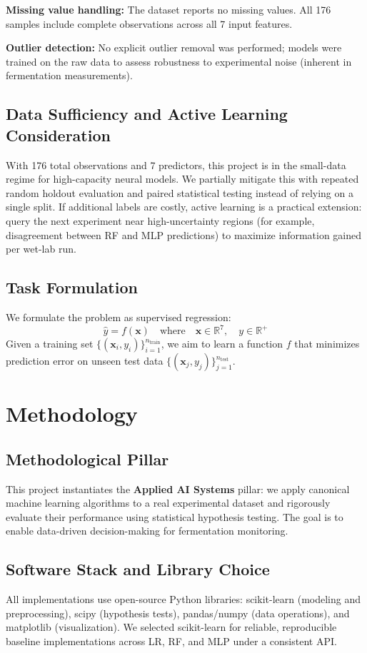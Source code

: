 \documentclass[conference]{IEEEtran}
\begin{document}
\textbf{Missing value handling:} The dataset reports no missing values. All 176 samples include complete observations across all 7 input features.

\textbf{Outlier detection:} No explicit outlier removal was performed; models were trained on the raw data to assess robustness to experimental noise (inherent in fermentation measurements).

\subsection{Data Sufficiency and Active Learning Consideration}
With 176 total observations and 7 predictors, this project is in the small-data regime for high-capacity neural models. We partially mitigate this with repeated random holdout evaluation and paired statistical testing instead of relying on a single split. If additional labels are costly, active learning is a practical extension: query the next experiment near high-uncertainty regions (for example, disagreement between RF and MLP predictions) to maximize information gained per wet-lab run.

\subsection{Task Formulation}
We formulate the problem as supervised regression:
\[
\hat{y} = f(\mathbf{x}) \quad \text{where} \quad \mathbf{x} \in \mathbb{R}^7, \quad y \in \mathbb{R}^+
\]
Given a training set $\{(\mathbf{x}_i, y_i)\}_{i=1}^{n_{\text{train}}}$, we aim to learn a function $f$ that minimizes prediction error on unseen test data $\{(\mathbf{x}_j, y_j)\}_{j=1}^{n_{\text{test}}}$.

\section{Methodology}

\subsection{Methodological Pillar}
This project instantiates the \textbf{Applied AI Systems} pillar: we apply canonical machine learning algorithms to a real experimental dataset and rigorously evaluate their performance using statistical hypothesis testing. The goal is to enable data-driven decision-making for fermentation monitoring.

\subsection{Software Stack and Library Choice}
All implementations use open-source Python libraries: scikit-learn (modeling and preprocessing), scipy (hypothesis tests), pandas/numpy (data operations), and matplotlib (visualization). We selected scikit-learn for reliable, reproducible baseline implementations across LR, RF, and MLP under a consistent API.
\end{document}
